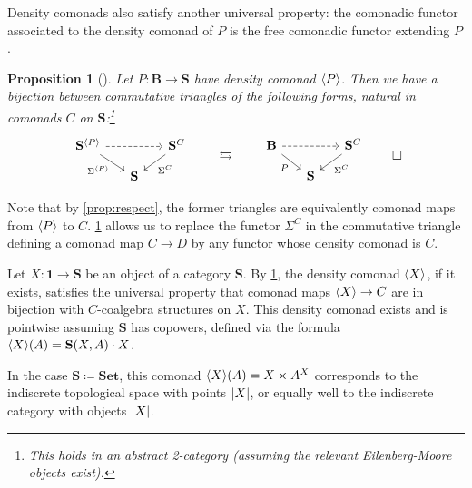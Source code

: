 \documentclass[11pt, oneside, article]{memoir}
\theoremstyle{plain}
\newtheorem{proposition}[theorem]{Proposition}
\theoremstyle{definition}
\theoremstyle{remark}
\newenvironment{example}
{\renewcommand\qedsymbol{$\lrcorner$}%
  \pushQED{\qed}\myexample}
{\popQED\endmyexample}
\DeclarePairedDelimiter{\gen}{\langle}{\rangle}
\DeclarePairedDelimiter{\abs}{\lvert}{\rvert}
\newcommand{\namedcat}[1]{\mathbf{#1}}
\newcommand{\cat}[1]{\mathbf{#1}}
\newcommand{\Set}{\namedcat{Set}}
\newcommand{\CoalgOn}[2]{{#2}^{#1}}
\newcommand{\CoalgS}[1]{\CoalgOn{#1}{\bS}}
\newcommand{\pts}[1]{{\abs{#1}}}
\newcommand{\obs}[1]{\pts{#1}}
\newcommand{\carr}{\Sigma}
\newcommand{\point}{\mathbf{1}}
\newcommand{\car}[1]{\carr^{#1}}
\newcommand{\carC}{\car{\cC}}
\newcommand{\carP}{\car{\cP}}
\newcommand{\ph}[1]{#1}
\newcommand{\cmnd}[1]{{#1}}
\newcommand{\xA}{A}
\newcommand{\xX}{X}
\newcommand{\cC}{\cmnd{C}}
\newcommand{\cD}{\cmnd{D}}
\newcommand{\bB}{\cat{B}}
\newcommand{\bS}{\cat{S}}
\newcommand{\pP}{\ph{P}}
\newcommand{\cP}{\gen{\pP}}
\newcommand{\CS}{\CoalgS{\cC}}
\newcommand{\PS}{\CoalgS{\cP}}
\begin{document}
Density comonads also satisfy another universal property: the comonadic functor associated to the density comonad of
$\pP$ is the free comonadic functor extending $\pP$.

\begin{proposition}[{\cite[Section II.1]{dubuc}}]\label{prop:density}
  Let $\pP \colon \bB \to \bS$ have density comonad $\cP$.
  Then we have a bijection between commutative triangles of the
  following forms, natural in comonads $\cC$ on
  $\bS$:\footnote{This holds in an abstract 2-category (assuming the
    relevant Eilenberg-Moore objects exist).}
  \[\begin{tikzcd}[row sep=10pt,column sep=15pt]
      {\PS} && {\CS} \\
      & {\bS}
      \arrow[dashed, from=1-1, to=1-3]
      \arrow["\carP"', from=1-1, to=2-2]
      \arrow["\carC", from=1-3, to=2-2]
    \end{tikzcd}
    \qquad
    \leftrightarrows
    \qquad
    \begin{tikzcd}[row sep=10pt,column sep=15pt]
      {\bB} && {\CS} \\
      & {\bS}
      \arrow[dashed, from=1-1, to=1-3]
      \arrow["\pP"', from=1-1, to=2-2]
      \arrow["\carC", from=1-3, to=2-2]
    \end{tikzcd}
    \qedhere
  \]
\end{proposition}

Note that by \cref{prop:respect}, the former triangles are
equivalently comonad maps from $\cP$ to $\cC$. \cref{prop:density}
allows us to replace the functor $\carC$ in the commutative triangle
defining a comonad map $\cC \to \cD$ by any functor whose density
comonad is $\cC$.

\begin{example}[Indiscrete comonads]\label{ex:indiscrete}
  Let $\xX \colon \point \to \bS$ be an object of a category $\bS$. By
  \cref{prop:density}, the density comonad $\gen{\xX}$, if it exists,
  satisfies the universal property that comonad maps
  $\gen{\xX} \to \cC$ are in bijection with $\cC$-coalgebra structures
  on $\xX$. This density comonad exists and is pointwise assuming
  $\bS$ has copowers, defined via the formula
  $\gen{\xX}(\xA) = \bS(\xX, \xA) \cdot \xX$.

  In the case $\bS\coloneqq\Set$, this comonad
  $\gen{\xX}(\xA) = \xX \times \xA^\xX$ corresponds to the indiscrete
  topological space with points $\pts{\xX}$, or equally well to the
  indiscrete category with objects $\obs{\xX}$.
\end{example}
\end{document}
